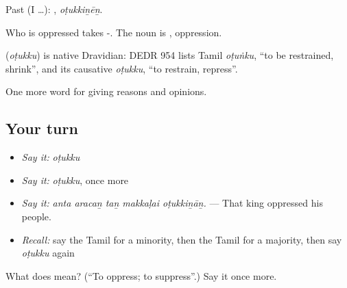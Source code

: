 Past (I …): , \emph{oṭukkiṉēṉ}.

Who is oppressed takes -. The noun is , oppression.

\begin{cousinweb}
\textbf{} (\emph{oṭukku}) is native Dravidian: DEDR 954 lists Tamil \emph{oṭuṅku}, \textquotedblleft{}to be restrained, shrink\textquotedblright{}, and its causative \emph{oṭukku}, \textquotedblleft{}to restrain, repress\textquotedblright{}.
\end{cousinweb}

\begin{grammarlens}[title={What you've built}]
One more word for giving reasons and opinions.
\end{grammarlens}

\subsection*{Your turn}
\begin{itemize}
\raggedright
  \item \emph{Say it:} \emph{oṭukku}
  \item \emph{Say it:} \emph{oṭukku}, once more
  \item \emph{Say it:} \emph{anta aracaṉ taṉ makkaḷai oṭukkiṉāṉ.} — That king oppressed his people.
  \item \emph{Recall:} say the Tamil for a minority, then the Tamil for a majority, then say \emph{oṭukku} again
\end{itemize}

\begin{tcolorbox}[breakable,colback=teal!4,colframe=teal!35!black,title={Before you move on}]
What does  mean? (\textquotedblleft{}To oppress; to suppress\textquotedblright{}.) Say it once more.
\end{tcolorbox}
